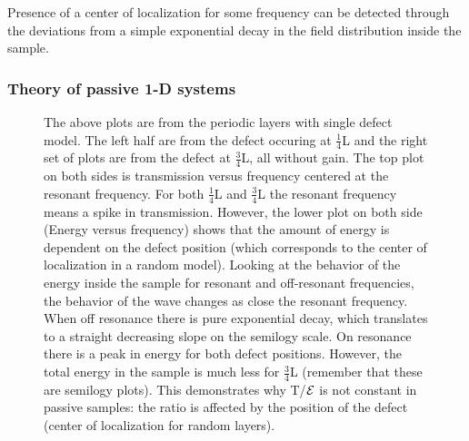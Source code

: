 Presence of a center of localization for some frequency can be detected
through the deviations from a simple exponential 
decay in the field distribution inside the sample.

\subsubsection {Theory of passive 1-D systems}


\begin{figure}
\vskip -0.5cm
\centerline{
}
\vskip -0.5cm
\caption{The above plots are from the periodic layers with
single defect model. The left half are from the defect occuring
at $ \frac{1}{4} $L and the right set of plots are from the defect
at $ \frac{3}{4} $L, all without gain.  The top plot on both 
sides is transmission versus frequency centered at the resonant
frequency. For both $ \frac{1}{4} $L and $ \frac{3}{4} $L the resonant
frequency means a spike in transmission.  However, the lower plot
on both side (Energy versus frequency) shows that the amount of
energy is dependent on the defect position (which corresponds to
the center of localization in a random model).  Looking at
the behavior of the energy inside the sample for resonant
and off-resonant frequencies, the behavior of the wave changes
as close the resonant frequency. When off resonance there is
pure exponential decay, which translates to a straight decreasing
slope on the semilogy scale. On resonance there is a peak in energy
for both defect positions. However, the total energy in the sample
is much less for $ \frac{3}{4} $L (remember that these are semilogy
plots).  This demonstrates why T/${\cal E}$ is not constant in passive samples:
the ratio is affected by the position of the defect (center of localization
for random layers).}


\label{fig:peaksmatchnotmatch}
\end{figure}

